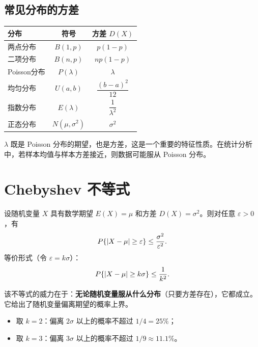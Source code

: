 \subsection{常见分布的方差}

\begin{center}
\begin{tabular}{lcc}
\toprule
\textbf{分布} & \textbf{符号} & \textbf{方差 $D(X)$} \\
\midrule
两点分布 & $B(1, p)$          & $p(1-p)$ \\
二项分布 & $B(n, p)$          & $np(1-p)$ \\
Poisson分布 & $P(\lambda)$   & $\lambda$ \\
均匀分布 & $U(a, b)$          & $\dfrac{(b-a)^2}{12}$ \\
指数分布 & $E(\lambda)$       & $\dfrac{1}{\lambda^2}$ \\
正态分布 & $N(\mu, \sigma^2)$ & $\sigma^2$ \\
\bottomrule
\end{tabular}
\end{center}

\begin{remark}
$\lambda$ 既是 Poisson 分布的期望，也是方差，这是一个重要的特征性质。在统计分析中，若样本均值与样本方差接近，则数据可能服从 Poisson 分布。
\end{remark}

\section{Chebyshev 不等式}

\begin{theorem}
设随机变量 $X$ 具有数学期望 $E(X) = \mu$ 和方差 $D(X) = \sigma^2$。则对任意 $\varepsilon > 0$，有
\[P\{\left|X - \mu\right| \geq \varepsilon\} \leq \frac{\sigma^2}{\varepsilon^2}.\]
等价形式（令 $\varepsilon = k\sigma$）：
\[P\{\left|X - \mu\right| \geq k\sigma\} \leq \frac{1}{k^2}.\]
\end{theorem}

该不等式的威力在于：\textbf{无论随机变量服从什么分布}（只要方差存在），它都成立。它给出了随机变量偏离期望的概率上界。
\begin{itemize}
	\item 取 $k = 2$：偏离 $2\sigma$ 以上的概率不超过 $1/4 = 25\%$；
	\item 取 $k = 3$：偏离 $3\sigma$ 以上的概率不超过 $1/9 \approx 11.1\%$。
\end{itemize}

